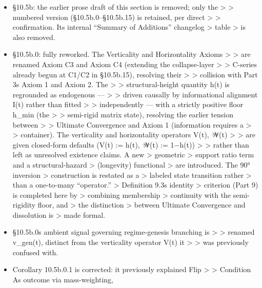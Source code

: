 \documentclass[
]{article}
\begin{document}
\begin{itemize}
\item
  §10.5b: the earlier prose draft of this section is removed; only the
  \textgreater{} \textgreater{} numbered version (§10.5b.0--§10.5b.15)
  is retained, per direct \textgreater{} \textgreater{} confirmation.
  Its internal ``Summary of Additions'' changelog \textgreater{} table
  \textgreater{} is also removed.
\item
  §10.5b.0: fully reworked. The Verticality and Horizontality Axioms
  \textgreater{} \textgreater{} are renamed Axiom C3 and Axiom C4
  (extending the collapse-layer \textgreater{} \textgreater{} C-series
  already begun at C1/C2 in §10.5b.15), resolving their \textgreater{}
  \textgreater{} collision with Part 3s Axiom 1 and Axiom 2. The
  \textgreater{} \textgreater{} structural-height quantity h(t) is
  regrounded as endogenous --- \textgreater{} \textgreater{} driven
  causally by informational alignment I(t) rather than fitted
  \textgreater{} \textgreater{} independently --- with a strictly
  positive floor h\_min (the \textgreater{} \textgreater{} semi-rigid
  matrix state), resolving the earlier tension between \textgreater{}
  \textgreater{} Ultimate Convergence and Axiom 1 (information requires
  a \textgreater{} \textgreater{} container). The verticality and
  horizontality operators V(t), 𝒲(t) \textgreater{} \textgreater{} are
  given closed-form defaults (V(t) := h(t), 𝒲(t) := 1−h(t))
  \textgreater{} \textgreater{} rather than left as unresolved existence
  claims. A new \textgreater{} geometric \textgreater{} support ratio
  term and a structural-hazard \textgreater{} (longevity) functional
  \textgreater{} are introduced. The 90° inversion \textgreater{}
  construction is restated as a \textgreater{} labeled state transition
  rather \textgreater{} than a one-to-many ``operator.'' \textgreater{}
  Definition 9.3s identity \textgreater{} criterion (Part 9) is
  completed here by \textgreater{} combining membership \textgreater{}
  continuity with the semi-rigidity floor, and \textgreater{} the
  distinction \textgreater{} between Ultimate Convergence and
  dissolution is \textgreater{} made formal.
\item
  §10.5b.0s ambient signal governing regime-genesis branching is
  \textgreater{} \textgreater{} renamed v\_gen(t), distinct from the
  verticality operator V(t) it \textgreater{} \textgreater{} was
  previously confused with.
\item
  Corollary 10.5b.0.1 is corrected: it previously explained Flip
  \textgreater{} \textgreater{} Condition As outcome via mass-weighting,

\end{itemize}
\end{document}
